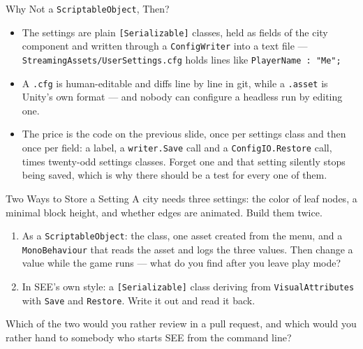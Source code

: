 \begin{frame}{Why Not a \texttt{ScriptableObject}, Then?}
  \begin{itemize}
    \item The settings are plain \texttt{[Serializable]} classes, held as
      fields of the city component and written through a \texttt{ConfigWriter}
      into a text file --- \texttt{StreamingAssets/UserSettings.cfg} holds
      lines like \texttt{PlayerName : "Me";}
    \item A \texttt{.cfg} is human-editable and diffs line by line in git,
      while a \texttt{.asset} is Unity's own format --- and nobody can
      configure a headless run by editing one.
    \item The price is the code on the previous slide, once per settings class
      and then once per field: a label, a \texttt{writer.Save} call and a
      \texttt{ConfigIO.Restore} call, times twenty-odd settings classes.
      Forget one and that setting silently stops being saved, which is why
      there should be a test for every one of them.
  \end{itemize}
\end{frame}

\begin{exerciseframe}{Two Ways to Store a Setting}
  A city needs three settings: the color of leaf nodes, a minimal block
  height, and whether edges are animated. Build them twice.
  \vspace{1ex}

  \begin{enumerate}
    \item As a \texttt{ScriptableObject}: the class, one asset created from the
      menu, and a \texttt{MonoBehaviour} that reads the asset and logs the
      three values. Then change a value while the game runs --- what do you
      find after you leave play mode?
    \item In SEE's own style: a \texttt{[Serializable]} class deriving from
      \texttt{VisualAttributes} with \texttt{Save} and \texttt{Restore}. Write
      it out and read it back.
  \end{enumerate}
  \vspace{1ex}

  Which of the two would you rather review in a pull request, and which would
  you rather hand to somebody who starts SEE from the command line?
\end{exerciseframe}

